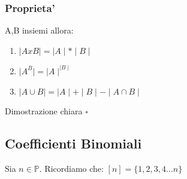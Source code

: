 \documentclass{article}
\begin{document}
      \subsubsection{Proprieta'}
      A,B insiemi allora:
      \begin{enumerate}
        \item $\mid AxB \mid = \mid A \mid * \mid B \mid$
        \item $\mid A^B \mid = \mid A \mid^{\mid B \mid}$
        \item $\mid A \cup B \mid = \mid A \mid + \mid B \mid - \mid A \cap B \mid$
      \end{enumerate}
      Dimostrazione chiara $\square$
      \subsection{Coefficienti Binomiali}
      \begin{flushleft}
        Sia $n\in \mathbb{P}$. Ricordiamo che: $[n]=\{1,2,3,4...n\}$
      \end{flushleft}
\end{document}
